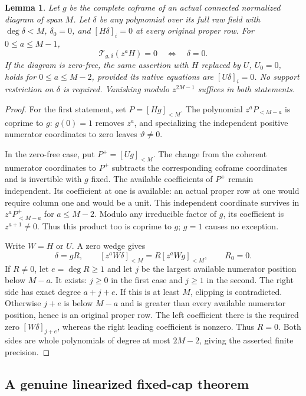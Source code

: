 \documentclass[11pt,a4paper]{amsart}
\numberwithin{equation}{section}
\theoremstyle{plain}
\newtheorem{lemma}[theorem]{Lemma}
\theoremstyle{definition}
\begin{document}
\begin{lemma}\label{sc:finite-injectivity}
Let \(g\) be the complete coframe of an actual connected normalized
diagram of span \(M\).  Let \(\delta\) be any polynomial over its full
raw field with \(\deg\delta<M\), \(\delta_0=0\), and
\([H\delta]_i=0\) at every original proper row.  For
\(0\le a\le M-1\),
\[
 \mathcal T_{g,\delta}(z^aH)=0\quad\Longleftrightarrow\quad\delta=0.
\]
If the diagram is zero-free, the same assertion with \(H\) replaced
by \(U\), \(U_0=0\), holds for \(0\le a\le M-2\), provided its native
equations are \([U\delta]_i=0\).  No support restriction on
\(\delta\) is required.  Vanishing modulo \(z^{2M-1}\) suffices in
both statements.
\end{lemma}
\begin{proof}
For the first statement, set \(P=[Hg]_{<M}\).  The polynomial
\(z^aP_{<M-a}\) is coprime to \(g\): \(g(0)=1\) removes \(z^a\), and
specializing the independent positive numerator coordinates to zero
leaves \(\vartheta\ne0\).

In the zero-free case, put \(P^+=[Ug]_{<M}\).  The change from the
coherent numerator coordinates to \(P^+\) subtracts the corresponding
coframe coordinates and is invertible with \(g\) fixed.  The available
coefficients of \(P^+\) remain independent.  Its coefficient at one
is available: an actual proper row at one would require column one
and would be a unit.  This independent coordinate survives in
\(z^aP^+_{<M-a}\) for \(a\le M-2\).  Modulo any irreducible factor of
\(g\), its coefficient is \(z^{a+1}\ne0\).  Thus this product too is
coprime to \(g\); \(g=1\) causes no exception.

Write \(W=H\) or \(U\).  A zero wedge gives
\[
 \delta=gR,\qquad
 [z^aW\delta]_{<M}=R[z^aWg]_{<M},\qquad R_0=0.
\]
If \(R\ne0\), let \(e=\deg R\ge1\) and let \(j\) be the largest
available numerator position below \(M-a\).  It exists: \(j\ge0\)
in the first case and \(j\ge1\) in the second.  The right side has
exact degree \(a+j+e\).  If this is at least \(M\), clipping is
contradicted.  Otherwise \(j+e\) is below \(M-a\) and is greater than
every available numerator position, hence is an original proper row.
The left coefficient there is the required zero \([W\delta]_{j+e}\),
whereas the right leading coefficient is nonzero.  Thus \(R=0\).
Both sides are whole polynomials of degree at most \(2M-2\), giving
the asserted finite precision.
\end{proof}

\subsection{A genuine linearized fixed-cap theorem}
\end{document}
